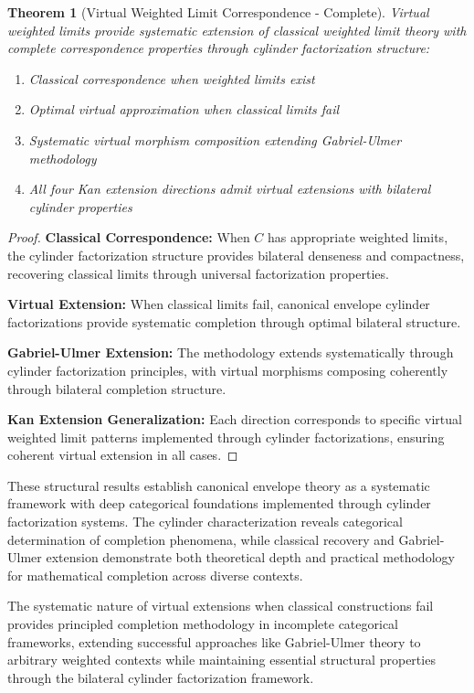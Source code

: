 \documentclass[11pt]{article}
\theoremstyle{plain}
\newtheorem{theorem}{Theorem}[section]
\theoremstyle{definition}
\theoremstyle{remark}
\begin{document}
\begin{theorem}[Virtual Weighted Limit Correspondence - Complete]
Virtual weighted limits provide systematic extension of classical weighted limit theory with complete correspondence properties through cylinder factorization structure:

\begin{enumerate}
\item Classical correspondence when weighted limits exist
\item Optimal virtual approximation when classical limits fail
\item Systematic virtual morphism composition extending Gabriel-Ulmer methodology
\item All four Kan extension directions admit virtual extensions with bilateral cylinder properties
\end{enumerate}
\end{theorem}

\begin{proof}
\textbf{Classical Correspondence:} When $C$ has appropriate weighted limits, the cylinder factorization structure provides bilateral denseness and compactness, recovering classical limits through universal factorization properties.

\textbf{Virtual Extension:} When classical limits fail, canonical envelope cylinder factorizations provide systematic completion through optimal bilateral structure.

\textbf{Gabriel-Ulmer Extension:} The methodology extends systematically through cylinder factorization principles, with virtual morphisms composing coherently through bilateral completion structure.

\textbf{Kan Extension Generalization:} Each direction corresponds to specific virtual weighted limit patterns implemented through cylinder factorizations, ensuring coherent virtual extension in all cases.
\end{proof}

These structural results establish canonical envelope theory as a systematic framework with deep categorical foundations implemented through cylinder factorization systems. The cylinder characterization reveals categorical determination of completion phenomena, while classical recovery and Gabriel-Ulmer extension demonstrate both theoretical depth and practical methodology for mathematical completion across diverse contexts.

The systematic nature of virtual extensions when classical constructions fail provides principled completion methodology in incomplete categorical frameworks, extending successful approaches like Gabriel-Ulmer theory to arbitrary weighted contexts while maintaining essential structural properties through the bilateral cylinder factorization framework.
\end{document}

